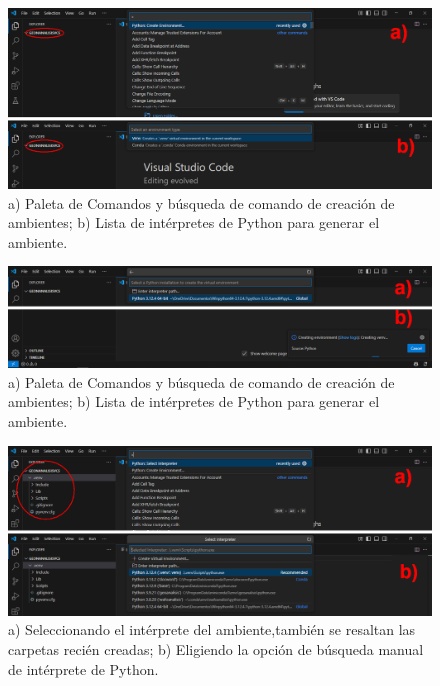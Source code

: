 \documentclass{article}
\begin{document}
	\begin{figure}[H]
		\centering
		\includegraphics[width=0.9\linewidth]{Figura18}
		\caption{a) Paleta de Comandos y búsqueda de comando de creación de ambientes; b) Lista de intérpretes de Python para generar el ambiente.}
		\label{fig:figura18}
	\end{figure}
	
	\begin{figure}[H]
		\centering
		\includegraphics[width=0.9\linewidth]{Figura19}
		\caption{a) Paleta de Comandos y búsqueda de comando de creación de ambientes; b) Lista de intérpretes de Python para generar el ambiente.}
		\label{fig:figura19}
	\end{figure}
	
	\begin{figure}[H]
		\centering
		\includegraphics[width=0.9\linewidth]{Figura20}
		\caption{a) Seleccionando el intérprete del ambiente,también se resaltan las carpetas recién creadas; b) Eligiendo la opción de búsqueda manual de intérprete de Python.}
		\label{fig:figura20}
	\end{figure}
	
\end{document}
